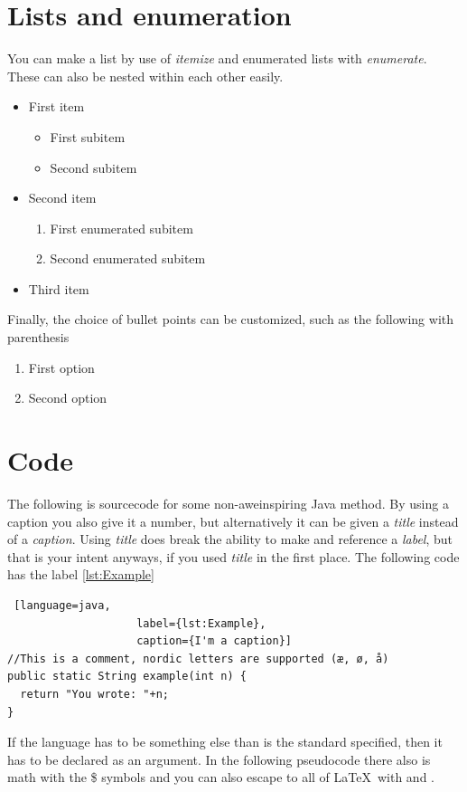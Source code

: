 \documentclass[a4, english]{article}
\begin{document}
\section{Lists and enumeration}
You can make a list by use of \emph{itemize} and enumerated lists with
\emph{enumerate}. These can also be nested within each other easily.
\begin{itemize}
\item First item
  \begin{itemize}
  \item First subitem
  \item Second subitem
  \end{itemize}
\item Second item
  \begin{enumerate}
  \item First enumerated subitem
  \item Second enumerated subitem
  \end{enumerate}
\item Third item
\end{itemize}
Finally, the choice of bullet points can be customized, such as the following
with parenthesis
\begin{enumerate}[label=(\alph*)]
\item First option
\item Second option
\end{enumerate}

\section{Code}
The following is sourcecode for some non-aweinspiring Java method. By using a
caption you also give it a number, but alternatively it can be given a
\emph{title} instead of a \emph{caption}. Using \emph{title} does break the
ability to make and reference a \emph{label}, but that is your intent anyways,
if you used \emph{title} in the first place. The following code has the label
\ref{lst:Example}

\begin{lstlisting} [language=java,
                    label={lst:Example},
                    caption={I'm a caption}]
//This is a comment, nordic letters are supported (æ, ø, å)
public static String example(int n) {
  return "You wrote: "+n;
}
\end{lstlisting}

If the language has to be something else than is the standard specified, then it
has to be declared as an argument. In the following pseudocode there also is
math with the \$ symbols and you can also escape to all of \LaTeX\ with
 and .
\end{document}
